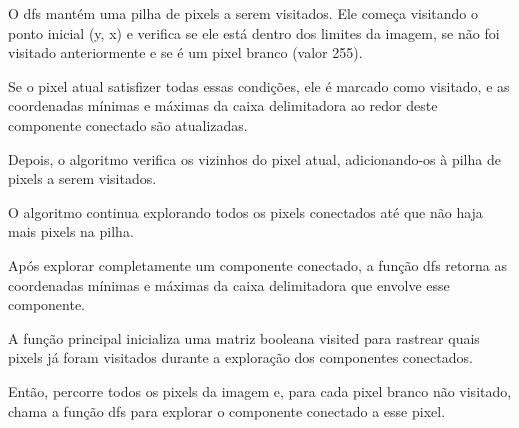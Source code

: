 \documentclass[english, 
               brazil, 
               bsc] %
               {dcomp-abntex2}
\begin{document}
O dfs mantém uma pilha de pixels a serem visitados. Ele começa visitando o ponto inicial (y, x) e verifica se ele está dentro dos limites da imagem, se não foi visitado anteriormente e se é um pixel branco (valor 255).

Se o pixel atual satisfizer todas essas condições, ele é marcado como visitado, e as coordenadas mínimas e máximas da caixa delimitadora ao redor deste componente conectado são atualizadas.

Depois, o algoritmo verifica os vizinhos do pixel atual, adicionando-os à pilha de pixels a serem visitados.

O algoritmo continua explorando todos os pixels conectados até que não haja mais pixels na pilha.

Após explorar completamente um componente conectado, a função dfs retorna as coordenadas mínimas e máximas da caixa delimitadora que envolve esse componente.

A função principal inicializa uma matriz booleana visited para rastrear quais pixels já foram visitados durante a exploração dos componentes conectados.

Então, percorre todos os pixels da imagem e, para cada pixel branco não visitado, chama a função dfs para explorar o componente conectado a esse pixel.
\end{document}

